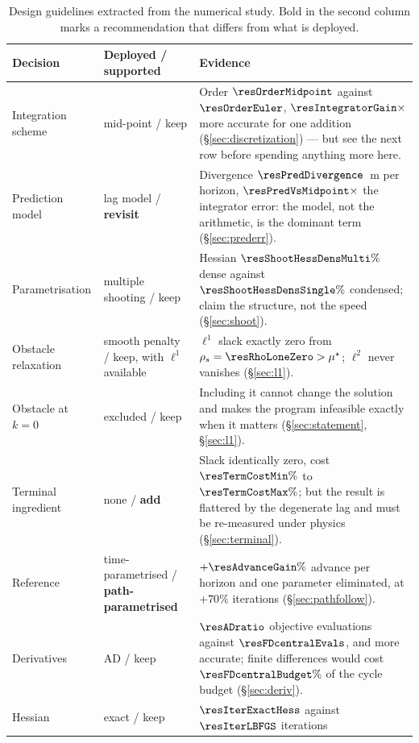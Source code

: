 \documentclass[11pt,a4paper]{article}
\begin{document}
\begin{table}[htbp]
  \centering
  \small
  \caption{Design guidelines extracted from the numerical study. Bold in the second column marks a
  recommendation that differs from what is deployed.}
  \label{tab:guidelines}
  \begin{tabular}{p{}p{}p{}}
    \toprule
    Decision & Deployed / supported & Evidence \\
    \midrule
    Integration scheme & mid-point / keep & Order $\resOrderMidpoint$ against $\resOrderEuler$,
      $\resIntegratorGain\times$ more accurate for one addition (\S\ref{sec:discretization}) --- but see the
      next row before spending anything more here. \\
    Prediction model & lag model / \textbf{revisit} & Divergence $\resPredDivergence$~m per horizon,
      $\resPredVsMidpoint\times$ the integrator error: the model, not the arithmetic, is the dominant term
      (\S\ref{sec:prederr}). \\
    Parametrisation & multiple shooting / keep & Hessian $\resShootHessDensMulti\%$ dense against
      $\resShootHessDensSingle\%$ condensed; claim the structure, not the speed (\S\ref{sec:shoot}). \\
    Obstacle relaxation & smooth penalty / keep, with $\ell^1$ available & $\ell^1$ slack exactly zero from
      $\rho_s=\resRhoLoneZero>\mu^\star$; $\ell^2$ never vanishes (\S\ref{sec:l1}). \\
    Obstacle at $k=0$ & excluded / keep & Including it cannot change the solution and makes the program
      infeasible exactly when it matters (\S\ref{sec:statement}, \S\ref{sec:l1}). \\
    Terminal ingredient & none / \textbf{add} & Slack identically zero, cost $\resTermCostMin\%$ to
      $\resTermCostMax\%$; but the result is flattered by the degenerate lag and must be re-measured under
      physics (\S\ref{sec:terminal}). \\
    Reference & time-parametrised / \textbf{path-parametrised} & $+\resAdvanceGain\%$ advance per horizon and
      one parameter eliminated, at $+70\%$ iterations (\S\ref{sec:pathfollow}). \\
    Derivatives & AD / keep & $\resADratio$ objective evaluations against $\resFDcentralEvals$, and more
      accurate; finite differences would cost $\resFDcentralBudget\%$ of the cycle budget
      (\S\ref{sec:deriv}). \\
    Hessian & exact / keep & $\resIterExactHess$ against $\resIterLBFGS$ iterations

\end{tabular}
\end{table}
\end{document}
